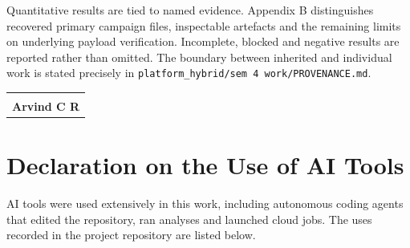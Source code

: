 Quantitative results are tied to named evidence. Appendix B distinguishes
recovered primary campaign files, inspectable artefacts and the remaining
limits on underlying payload verification. Incomplete, blocked and negative
results are reported rather than omitted. The boundary between inherited and
individual work is stated precisely in \texttt{platform\_hybrid/sem 4
work/PROVENANCE.md}.

\vspace{0.3in}
\noindent\begin{tabular}{@{}p{2.6in}@{}}

\dotfill \\
\textbf{Arvind C R} \\

\end{tabular}

\chapter*{Declaration on the Use of AI Tools}
\thispagestyle{plain}

AI tools were used extensively in this work, including autonomous coding
agents that edited the repository, ran analyses and launched cloud jobs. The
uses recorded in the project repository are listed below.

